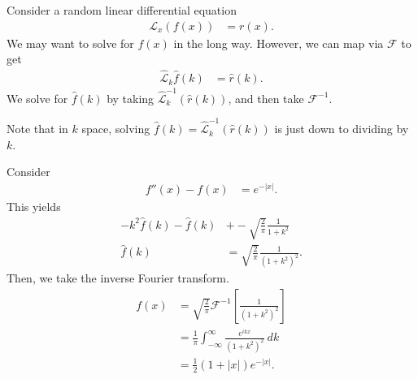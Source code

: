 \documentclass[10pt]{mypackage}
\begin{document}
\begin{example}
  Consider a random linear differential equation
  \begin{align*}
    \mathcal{L}_x\left(f(x)\right) &= r(x).
  \end{align*}
  We may want to solve for $f(x)$ in the long way. However, we can map via $\mathcal{F}$ to get
  \begin{align*}
    \widehat{\mathcal{L}}_k \widehat{f}\left(k\right) &= \widehat{r}\left(k\right).
  \end{align*}
  We solve for $\widehat{f}(k)$ by taking $\widehat{\mathcal{L}}_{k}^{-1}\left(\widehat{r}(k)\right)$, and then take $\mathcal{F}^{-1}$.\newline

  Note that in $k$ space, solving $\widehat{f}\left(k\right) = \widehat{\mathcal{L}}_{k}^{-1}\left(\widehat{r}\left(k\right)\right)$ is just down to dividing by $k$.
\end{example}
\begin{example}
  Consider
  \begin{align*}
    f''(x) - f(x) &= e^{-|x|}.
  \end{align*}
  This yields
  \begin{align*}
    -k^2\widehat{f}(k)-\widehat{f}(k) &+ -\sqrt{\frac{2}{\pi}}\frac{1}{1 + k^2}\\
    \widehat{f}(k) &= \sqrt{\frac{2}{\pi}}\frac{1}{\left(1 + k^2\right)^2}.
  \end{align*}
  Then, we take the inverse Fourier transform.
  \begin{align*}
    f(x) &= \sqrt{\frac{2}{\pi}} \mathcal{F}^{-1}\left[\frac{1}{\left(1 + k^2\right)^2}\right]\\
         &= \frac{1}{\pi} \int_{-\infty}^{\infty} \frac{e^{ikx}}{\left(1 + k^2\right)^2}\:dk\\
         &= \frac{1}{2}\left(1 + |x|\right)e^{-|x|}.
  \end{align*}
\end{example}
\end{document}
